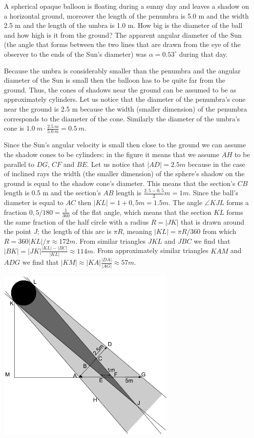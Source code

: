 {\ifEngStatement
A spherical opaque balloon is floating during a sunny day and leaves a shadow on a horizontal ground, moreover the length of the penumbra is 5.0 m and the width 2.5 m and the length of the umbra is 1.0 m. How big is the diameter of the ball and how high is it from the ground? The apparent angular diameter of the Sun (the angle that forms between the two lines that are drawn from the eye of the observer to the ends of the Sun’s diameter) was $\alpha =0.53^\circ$ during that day.
\fi


\ifEngHint
Because the umbra is considerably smaller than the penumbra and the angular diameter of the Sun is small then the balloon has to be quite far from the ground. Thus, the cones of shadows near the ground can be assumed to be as approximately cylinders. Let us notice that the diameter of the penumbra’s cone near the ground is 2.5 m because the width (smaller dimension) of the penumbra corresponds to the diameter of the cone. Similarly the diameter of the umbra’s cone is $\SI{1,0}{m}\cdot\frac{\SI{2,5}{m}}{\SI{5,0}{m}} = \SI{0,5}{m}$.
\fi


\ifEngSolution
Since the Sun's angular velocity is small then close to the ground we can assume the shadow cones to be cylinders: in the figure it means that we assume $AH$ to be parallel to $DG$, $CF$ and $BE$. Let us notice that $|AD|=\SI{2,5}m$ because in the case of inclined rays the width (the smaller dimension) of the sphere's shadow on the ground is equal to the shadow cone's diameter. This means that the section's $CB$ length is 0.5 m and the section's $AB$ length is $\frac{2,5-0,5}2\SI{}m=\SI{1}m$. Since the ball's diameter is equal to $AC$ then $|KL|=1+0,5\SI{}m=\SI{1,5}m$. The angle $\angle KJL$ forms a fraction $0,5/180=\frac 1{360}$ of the flat angle, which means that the section $KL$ forms the same fraction of the half circle with a radius $R=|JK|$ that is drawn around the point $J$; the length of this arc is $\pi R$, meaning $|KL|=\pi R /360$ from which $R=360|KL|/\pi\approx \SI{172}m$. From similar triangles $JKL$ and $JBC$ we find that $|BK|=|JK|\frac{|KL|-|BC|}{|KL|}\approx \SI{114}m$. From approximately similar triangles $KAM$ and $ADG$ we find that $|KM|\approx |KA|\frac{|DA|}{|AG|}\approx \SI{57}m$.
\begin{center}
\includegraphics[width=250pt]{2013-lahg-10-pxike-pall-vari}%
\end{center}
\fi
}